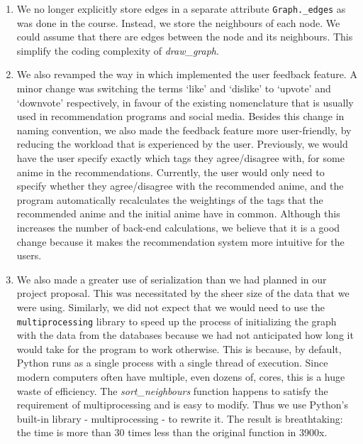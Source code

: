\documentclass[12pt]{article}
\begin{document}
\begin{enumerate}
\begin{text}
\begin{enumerate}
    \item We no longer explicitly store edges in a separate attribute \texttt{Graph.\_edges} as was done in the course. Instead, we store the neighbours of each node. We could assume that there are edges between the node and its neighbours. This simplify the coding complexity of \textit{draw\_graph}.
    
    \item We also revamped the way in which implemented the user feedback feature. A minor change was switching the terms `like' and `dislike' to `upvote' and `downvote' respectively, in favour of the existing nomenclature that is usually used in recommendation programs and social media. Besides this change in naming convention, we also made the feedback feature more user-friendly, by reducing the workload that is experienced by the user. Previously, we would have the user specify exactly which tags they agree/disagree with, for some anime in the recommendations. Currently, the user would only need to specify whether they agree/disagree with the recommended anime, and the program automatically recalculates the weightings of the tags that the recommended anime and the initial anime have in common. Although this increases the number of back-end calculations, we believe that it is a good change because it makes the recommendation system more intuitive for the users.
    
    \item We also made a greater use of serialization than we had planned in our project proposal. This was necessitated by the sheer size of the data that we were using. Similarly, we did not expect that we would need to use the \texttt{multiprocessing} library to speed up the process of initializing the graph with the data from the databases because we had not anticipated how long it would take for the program to work otherwise. This is because, by default, Python runs as a single process with a single thread of execution. Since modern computers often have multiple, even dozens of, cores, this is a huge waste of efficiency. The \textit{sort\_neighbours} function happens to satisfy the requirement of multiprocessing and is easy to modify. Thus we use Python's built-in library - multiprocessing - to rewrite it. The result is breathtaking: the time is more than 30 times less than the original function in 3900x.
\end{enumerate}

\end{text}


\end{enumerate}
\end{document}
